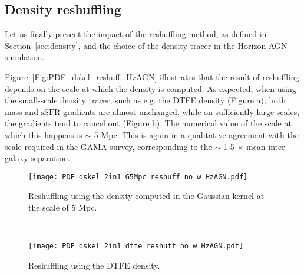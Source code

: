 \documentclass[useAMS,usenatbib]{mnras}
\newcommand{\ssfr}{$\mbox{sSFR}$\xspace}
\newcommand{\hagn}{\mbox{{\sc \small Horizon-AGN}}}
\begin{document}
\subsection{Density reshuffling}
\label{subsec:appendix_density_HzAGN}
\balance
Let us finally present the impact of the reshuffling method, as defined in Section~\ref{sec:density}, and the choice of the density tracer in the \hagn\,simulation.   

Figure~\ref{Fig:PDF_dskel_reshuff_HzAGN} 
illustrates that the result of reshuffling depends on the scale at which the density is computed. As expected, when using the small-scale density tracer, such as e.g. the DTFE density (Figure a), both mass and \ssfr gradients are almost unchanged, while on sufficiently large scales, the gradients tend to cancel out (Figure b). The numerical value of the scale at which this happens is $\sim$ 5 Mpc. This is again in a qualitative agreement with the scale required in the GAMA survey, corresponding to the $\sim$ 1.5 $\times$ mean inter-galaxy separation.
  

\begin{figure*}
    \centering
    \begin{subfigure}{\textwidth}
        \centering
        \texttt{[image: PDF\_dskel\_2in1\_G5Mpc\_reshuff\_no\_w\_HzAGN.pdf]}
        \caption{Reshuffling using the density computed in the Gaussian kernel at the scale of 5 Mpc.}
    \end{subfigure}%
    \\
    \begin{subfigure}{\textwidth}
        \centering
        \texttt{[image: PDF\_dskel\_2in1\_dtfe\_reshuff\_no\_w\_HzAGN.pdf]}
        \caption{Reshuffling using the DTFE density.}
    \end{subfigure}
    \caption{\textit{Top rows:} As in Figure~\ref{Fig:PDF_dskel_dwall_HzAGN} for the distances to the nearest filament, $D_{\mathrm{skel}}$. The contribution of the nodes is minimised by removing galaxies located within 3.5 Mpc around them from the analysis. The dashed lines correspond to the distributions after the application of the reshuffling method using two different density tracers, a large (Figure a) and small-scale (Figure b) estimators. The numerical values of medians, shown as a vertical lines, are listed in Table~\ref{tab:medians_dskel_dens_reshuff_hagn}. In qualitative agreement with the results obtained with the observed data, in order to cancel the gradients, density at sufficiently large scale has to be considered. This corresponds to 5 Mpc in the \hagn\,simulation, representing $\sim$ 1.5$\times$ mean inter-galaxy separation, again in agreement with the value found in observations.   
 \textit{Bottom rows:} As in Figure~\ref{Fig:PDF_dskel_dwall_HzAGN} before (solid lines) and after (dashed lines) the reshuffling.
 }
    \label{Fig:PDF_dskel_reshuff_HzAGN}
\end{figure*}
\end{document}
